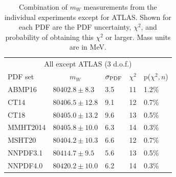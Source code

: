 

\begin{table}[!tp]
  \centering
  \begin{tabular}{lllll}
\hline \hline
                              \multicolumn{5}{c}{All except ATLAS (3 d.o.f.)} \\
PDF set                      & \multicolumn{1}{c}{$m_W$} & $\sigma_{\scriptsize\textrm{PDF}}$ & $\chi^2$ & p($\chi^2,n$)\\
\hline 
                             ABMP16 & $80402.8 \pm  8.3$ &  3.5 & 11 & 1.2\% \\
                               CT14 & $80406.5 \pm 12.8$ &  9.1 & 12 & 0.7\% \\
                               CT18 & $80405.0 \pm 13.2$ &  9.6 & 13 & 0.5\% \\
                           MMHT2014 & $80405.8 \pm 10.0$ &  6.3 & 14 & 0.3\% \\
                             MSHT20 & $80404.2 \pm 10.3$ &  6.6 & 12 & 0.7\%  \\
                           NNPDF3.1 & $80414.7 \pm  9.5$ &  5.6 & 13 & 0.5\%  \\
                           NNPDF4.0 & $80420.2 \pm 10.0$ &  6.2 & 14 & 0.3\% \\
                            \hline \hline 
\end{tabular}
  \caption{Combination of $m_W$ measurements from the individual experiments except for ATLAS.
      Shown for each PDF are the PDF uncertainty, $\chi^2$, and probability of
  obtaining this $\chi^2$ or larger.  Mass units are in MeV.
    \label{tbl:all5_opt2}}
\end{table}


